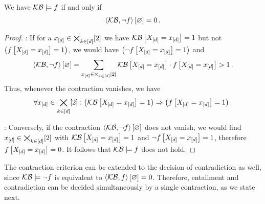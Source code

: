 \begin{theorem}
    \label{the:contCriterionLogEntailment}
    We have $\mathcal{KB}\models f$ if and only if
    \begin{align*}
        \left\langle \mathcal{KB},\lnot f\right\rangle \left[ \varnothing \right] = 0 \, .
    \end{align*}
\end{theorem}
\begin{proof}
    \proofleftsymbol:
    If for a $x_{[d]}\in\bigtimes_{k\in[d]}[2]$ we have $\mathcal{KB}\left[X_{[d]}=x_{[d]}\right]=1$ but not $\big(f\left[X_{[d]}=x_{[d]}\right]=1\big)$, we would have $\big(\lnot f\left[X_{[d]}=x_{[d]}\right]=1\big)$ and
    \begin{align*}
        \left\langle \mathcal{KB},\lnot f\right\rangle \left[ \varnothing \right] =
        \sum_{x_{[d]}\in\bigtimes_{k\in[d]}[2]} \mathcal{KB}\left[X_{[d]}=x_{[d]}\right] \cdot f\left[X_{[d]}=x_{[d]}\right] > 1 \, .
    \end{align*}
    Thus, whenever the contraction vanishes, we have
    \begin{align*}
        \forall{x_{[d]}\in\bigtimes_{k\in[d]}[2]}:{\left(\mathcal{KB}\left[X_{[d]}=x_{[d]}\right]=1\right)\Rightarrow\left(f\left[X_{[d]}=x_{[d]}\right]=1\right)} \, .
    \end{align*}

    \proofrightsymbol:
    Conversely, if the contraction $\left\langle \mathcal{KB},\lnot f\right\rangle \left[ \varnothing \right]$ does not vanish, we would find $x_{[d]}\in\bigtimes_{k\in[d]}[2]$ with $\mathcal{KB}\left[X_{[d]}=x_{[d]}\right]=1$ and $\lnot f\left[X_{[d]}=x_{[d]}\right]=1$, therefore $f\left[X_{[d]}=x_{[d]}\right]=0$.
    It follows that $\mathcal{KB}\models f$ does not hold.
\end{proof}


The contraction criterion can be extended to the decision of contradiction as well, since $\mathcal{KB}\models\lnot f$ is equivalent to $\left\langle \mathcal{KB},f\right\rangle \left[ \varnothing \right]=0$.
Therefore, entailment and contradiction can be decided simultaneously by a single contraction, as we state next.

